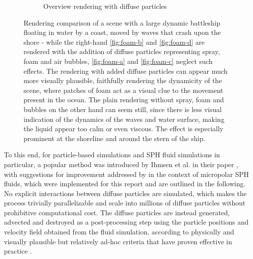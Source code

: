 \documentclass[oneside, a4paper]{book}
\begin{document}
\begin{figure}
\begin{subfigure}[t][0.5\textwidth]{0.5\textwidth}
      \caption{Overview rendering with diffuse particles}
      \label{fig:foam-d}
    \end{subfigure}
    \vspace{0.5cm}
    \caption{Rendering comparison of a scene with a large dynamic battleship floating in water by a coast, moved by waves that crash upon the shore - while the right-hand \autoref{fig:foam-b} and \autoref{fig:foam-d} are rendered with the addition of diffuse particles representing spray, foam and air bubbles, \autoref{fig:foam-a} and \autoref{fig:foam-c} neglect such effects. The rendering with added diffuse particles can appear much more visually plausible, faithfully rendering the dynamicity of the scene, where patches of foam act as a visual clue to the movement present in the ocean. The plain rendering without spray, foam and bubbles on the other hand can seem still, since there is less visual indication of the dynamics of the waves and water surface, making the liquid appear too calm or even viscous. The effect is especially prominent at the shoreline and around the stern of the ship.}
    \label{fig:foam-with-without}
  \end{figure}
  
  To this end, for particle-based simulations and SPH fluid simulations in particular, a popular method was introduced by Ihmsen et al. in their paper \autocite[Unified Spray, Foam and Bubbles for Particle-Based Fluids]{spray-foam-bubbles}, with suggestions for improvement addressed by \autocite[Bender et al.]{turbulent-micropolar-foam} in the context of micropolar SPH fluids, which were implemented for this report and are outlined in the following. No explicit interactions between diffuse particles are simulated, which makes the process trivially parallelizable and scale into millions of diffuse particles without prohibitive computational cost. The diffuse particles are instead generated, advected and destroyed as a post-processing step using the particle positions and velocity field obtained from the fluid simulation, according to physically and visually plausible but relatively ad-hoc criteria that have proven effective in practice \autocites{turbulent-micropolar-foam}{unified-spray-foam-bubbles}.
\end{document}
